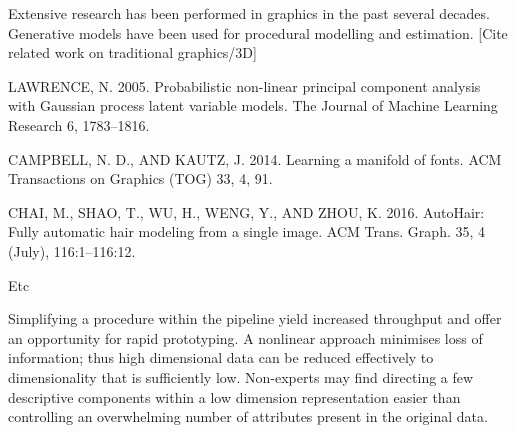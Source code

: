\documentclass[a4paper, fontsize=15pt, onecolumn]{article} %
\numberwithin{equation}{section} %
\numberwithin{figure}{section} %
\numberwithin{table}{section} %
\begin{document}

Extensive research has been performed in graphics in the past several decades. Generative models have been used for procedural modelling and estimation.
[Cite related work on traditional graphics/3D]

LAWRENCE, N. 2005. Probabilistic non-linear principal component analysis with Gaussian process latent variable models. The Journal of Machine Learning Research 6, 1783–1816. 

CAMPBELL, N. D., AND KAUTZ, J. 2014. Learning a manifold of fonts. ACM Transactions on Graphics (TOG) 33, 4, 91. 

CHAI, M., SHAO, T., WU, H., WENG, Y., AND ZHOU, K. 2016. AutoHair: Fully automatic hair modeling from a single image. ACM Trans. Graph. 35, 4 (July), 116:1–116:12.

Etc

Simplifying a procedure within the pipeline yield increased throughput and offer an opportunity for rapid prototyping. A nonlinear approach minimises loss of information; thus high dimensional data can be reduced effectively to dimensionality that is sufficiently low. Non-experts may find directing a few descriptive components within a low dimension representation easier than controlling an overwhelming number of attributes present in the original data.
\end{document}
